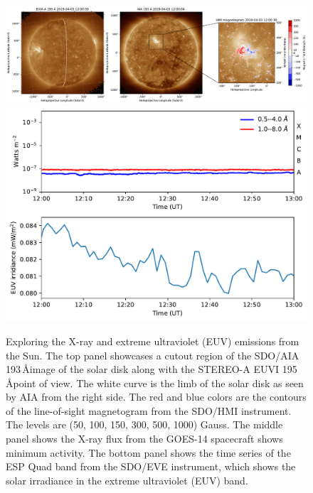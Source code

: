 \begin{figure}[!htp]
\centering
\includegraphics[width=\hsize]{chapter3/figs/aia_sta_cutout.pdf}
\includegraphics[width=12cm]{chapter3/figs/xrs_eve.pdf}
\caption{Exploring the X-ray and extreme ultraviolet (EUV) emissions from the Sun. The top panel showcases a cutout region of the SDO/AIA 193\,\AA image of the solar disk along with the STEREO-A EUVI 195\,\AA point of view. The white curve is the limb of the solar disk as seen by AIA from the right side. The red and blue colors are the contours of the line-of-sight magnetogram from the SDO/HMI instrument. The levels are (50, 100, 150, 300, 500, 1000) Gauss. The middle panel shows the X-ray flux from the GOES-14 spacecraft shows minimum activity. The bottom panel shows the time series of the ESP Quad band from the SDO/EVE instrument, which shows the solar irradiance in the extreme ultraviolet (EUV) band.}
\label{soldisk_xrs}
\end{figure}

